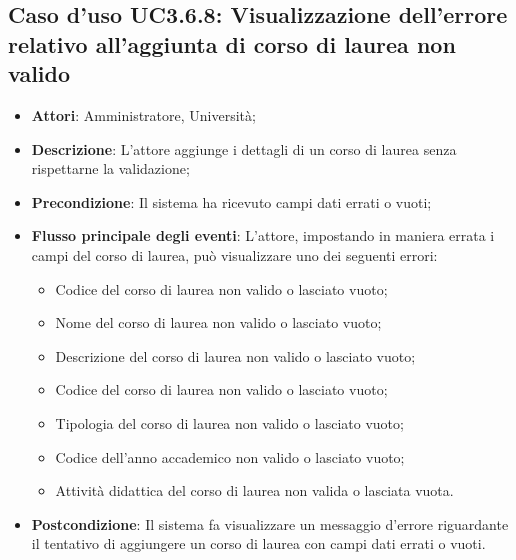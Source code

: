 \subsection{Caso d'uso \texorpdfstring{UC3.6.8}{UC3.6.8}: Visualizzazione dell'errore relativo all’aggiunta di corso di laurea non valido }
\begin{itemize}
	\item \textbf{Attori}: Amministratore, Università;
	\item \textbf{Descrizione}: L'attore aggiunge i dettagli di un corso di laurea senza rispettarne la validazione;
	
	\item \textbf{Precondizione}: Il sistema ha ricevuto campi dati errati o vuoti;
	
	\item \textbf{Flusso principale degli eventi}: L'attore, impostando in maniera errata i campi del corso di laurea, può visualizzare uno dei seguenti errori: \begin{itemize}
		\item Codice del corso di laurea non valido o lasciato vuoto;
		\item Nome del corso di laurea non valido o lasciato vuoto;
		\item Descrizione del corso di laurea non valido o lasciato vuoto;
		\item Codice del corso di laurea non valido o lasciato vuoto;
		\item Tipologia del corso di laurea non valido o lasciato vuoto;
		\item Codice dell'anno accademico non valido o lasciato vuoto;
		\item Attività didattica del corso di laurea non valida o lasciata vuota.
	\end{itemize}
	
	\item \textbf{Postcondizione}: Il sistema fa visualizzare un messaggio d'errore riguardante il tentativo di aggiungere un corso di laurea con campi dati errati o vuoti.
	
\end{itemize}
